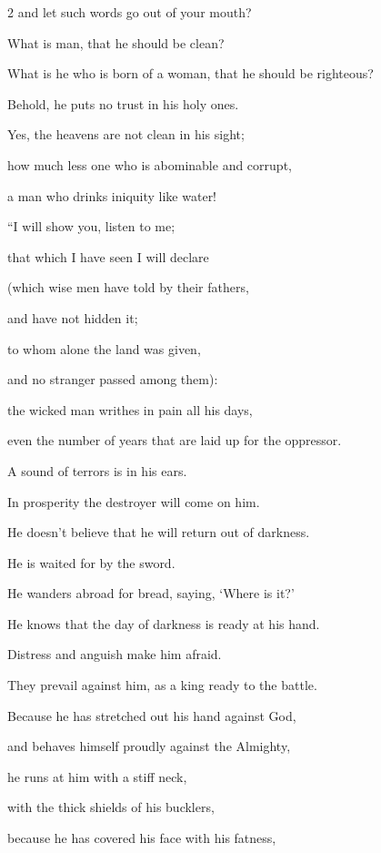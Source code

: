 \begin{multicols}{2}
	and let such words go out of your mouth?
	
	\myverse{}What is man, that he should be clean?
	
	What is he who is born of a woman, that he should be righteous?
	
	\myverse{}Behold, he puts no trust in his holy ones.
	
	Yes, the heavens are not clean in his sight;
	
	\myverse{}how much less one who is abominable and corrupt,
	
	a man who drinks iniquity like water!
	
	\vspace{\baselineskip}
	
	\myverse{}“I will show you, listen to me;
	
	that which I have seen I will declare
	
	\myverse{}(which wise men have told by their fathers,
	
	and have not hidden it;
	
	\myverse{}to whom alone the land was given,
	
	and no stranger passed among them):
	
	\myverse{}the wicked man writhes in pain all his days,
	
	even the number of years that are laid up for the oppressor.
	
	\myverse{}A sound of terrors is in his ears.
	
	In prosperity the destroyer will come on him.
	
	\myverse{}He doesn’t believe that he will return out of darkness.
	
	He is waited for by the sword.
	
	\myverse{}He wanders abroad for bread, saying, ‘Where is it?’
	
	He knows that the day of darkness is ready at his hand.
	
	\myverse{}Distress and anguish make him afraid.
	
	They prevail against him, as a king ready to the battle.
	
	\myverse{}Because he has stretched out his hand against God,
	
	and behaves himself proudly against the Almighty,
	
	\myverse{}he runs at him with a stiff neck,
	
	with the thick shields of his bucklers,
	
	\myverse{}because he has covered his face with his fatness,
	

\end{multicols}
